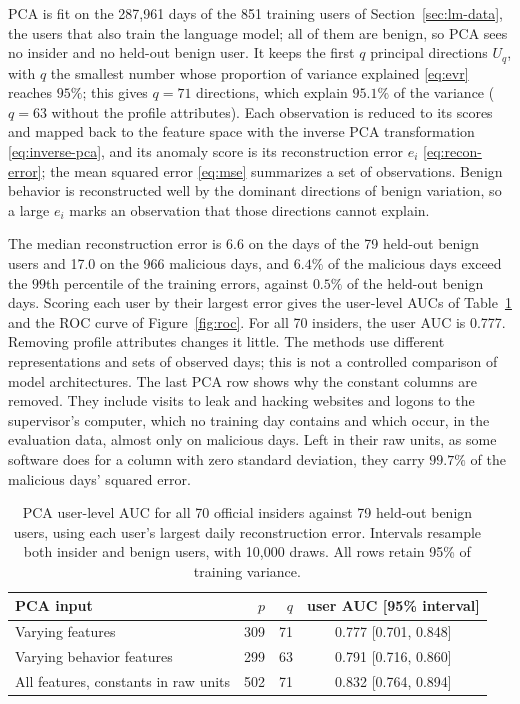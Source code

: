 \documentclass[12pt]{report}
\begin{document}
PCA is fit on the 287,961 days of the 851 training users of Section~\ref{sec:lm-data}, the users
that also train the language model; all of them are benign, so PCA sees no insider and no
held-out benign user. It keeps the first $q$ principal directions $U_q$, with $q$ the smallest
number whose proportion of variance explained \eqref{eq:evr} reaches $95\%$; this gives $q = 71$
directions, which explain $95.1\%$ of the variance ($q = 63$ without the profile attributes). Each
observation is reduced to its scores and mapped back to the feature space with the inverse PCA
transformation \eqref{eq:inverse-pca}, and its anomaly score is its reconstruction error $e_i$
\eqref{eq:recon-error}; the mean squared error \eqref{eq:mse} summarizes a set of observations.
Benign behavior is reconstructed well by the dominant directions of benign variation, so a large
$e_i$ marks an observation that those directions cannot explain.

The median reconstruction error is 6.6 on the days of the 79 held-out benign users and 17.0 on
the 966 malicious days, and $6.4\%$ of the malicious days exceed the $99$th percentile of the
training errors, against $0.5\%$ of the held-out benign days. Scoring each user by their largest
error gives the user-level AUCs of Table~\ref{tab:pca-results} and the ROC curve of
Figure~\ref{fig:roc}. For all 70 insiders, the user AUC is 0.777. Removing profile attributes changes it little.
The methods use different representations and sets of observed days; this is not a controlled
comparison of model architectures. The last PCA row shows why the constant columns are
removed. They include visits to leak and hacking websites and logons to the supervisor's computer,
which no training day contains and which occur, in the evaluation data, almost only on malicious
days. Left in their raw units, as some software does for a column with zero standard deviation,
they carry $99.7\%$ of the malicious days' squared error.


\begin{table}[!htbp]
\centering
\caption[PCA results for all 70 insiders]{PCA user-level AUC for all 70 official insiders against 79 held-out benign users,
using each user's largest daily reconstruction error. Intervals resample both insider and
benign users, with 10,000 draws. All rows retain 95\% of training variance.}
\label{tab:pca-results}
\begin{tabular}{lrrc}
\toprule
PCA input & $p$ & $q$ & user AUC [95\% interval] \\
\midrule
Varying features & 309 & 71 & 0.777 [0.701, 0.848] \\
Varying behavior features & 299 & 63 & 0.791 [0.716, 0.860] \\
All features, constants in raw units & 502 & 71 & 0.832 [0.764, 0.894] \\
\bottomrule
\end{tabular}
\end{table}
\end{document}
